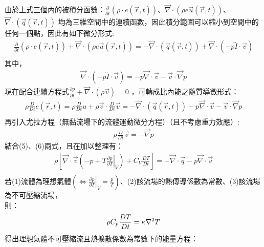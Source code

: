 \documentclass[12pt]{article}
\begin{document}
\noindent 由於上式三個內的被積分函數：$\frac{\partial}{\partial t}( \rho \cdot e (\vec{r} , t))$、$\vec{\nabla} \cdot (\rho e \vec{u}(\vec{r} , t)) $、$\vec{\nabla} \cdot (\vec{q} (\vec{r} , t))$ 均為三維空間中的連續函數，因此積分範圍可以縮小到空間中的任何一個點，因此有如下微分形式:
\begin{equation}
\begin{split}
  \frac{\partial}{\partial t}( \rho \cdot e (\vec{r} , t)) + \vec{\nabla} \cdot (\rho e \vec{u}(\vec{r} , t)) = -\vec{\nabla} \cdot (\vec{q} (\vec{r} , t)) + \vec{\nabla}\cdot (-p \overleftrightarrow{I} \cdot \vec{v})\\
\end{split}
\end{equation}
其中，
\begin{equation}
  \begin{split}
     \vec{\nabla}\cdot (-p \overleftrightarrow{I} \cdot \vec{v}) = -p \vec{\nabla} \cdot \vec{v} -\vec{v} \cdot \vec{\nabla} p
\end{split}
\end{equation}
\noindent 現在配合連續方程式$\frac{\partial \rho}{\partial t}+\vec{\nabla}\cdot(\rho \vec{v} ) = 0 $ ，可轉成比內能之隨質導數形式：
\begin{equation}
\begin{split}
  \rho \frac{D}{D t}e(\vec{r} , t) = \rho \frac{D}{D t} u + \rho \vec{v} \cdot \frac{D}{D t} \vec{v}= -\vec{\nabla} \cdot (\vec{q} (\vec{r} , t)) -p \vec{\nabla} \cdot \vec{v} -\vec{v} \cdot \vec{\nabla} p\\
\end{split}
\end{equation}
\noindent 再引入尤拉方程（無黏流場下的流體運動微分方程）（且不考慮重力效應）:
\begin{equation}
\begin{split}
    \rho \frac{D}{D t}\vec{v} = -\vec{\nabla} p
\end{split}
\end{equation}
\noindent 結合(5)、(6)兩式，且在加以整理有：
\begin{equation}
  \begin{split}
    \rho\left[\vec{\nabla}\cdot \vec{v}(-p+T\left.\frac{\partial p}{\partial T}\right|_{V})+C_{V}\frac{DT}{Dt}\right] = -\vec{\nabla} \cdot \vec{q} -p \vec{\nabla} \cdot \vec{v} \\
  \end{split}
\end{equation}
\noindent 若(1)流體為理想氣體$(\Leftrightarrow \left.\frac{\partial p}{\partial T}\right|_{V} = \frac{p}{T})$、(2)該流場的熱傳導係數為常數、(3)該流場為不可壓縮流場，\\
則：
\begin{equation}
  \begin{split}
    \rho C_{p} \frac{DT}{Dt}  = \kappa \laplacian T\\
  \end{split}
\end{equation}
\noindent 得出理想氣體不可壓縮流且熱擴散係數為常數下的能量方程：
\end{document}
